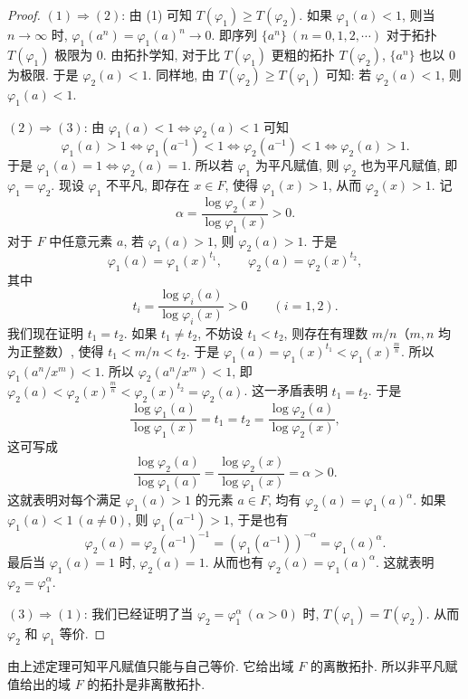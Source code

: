 \begin{proof}
$(1)\Rightarrow(2)$: 由 (1) 可知 $T(\varphi_1)\geqslant T(\varphi_2)$. 如果 $\varphi_1(a)<1$, 则当 $n\to\infty$ 时, $\varphi_1(a^n)=\varphi_1(a)^n\to 0$. 即序列 $\{a^n\}\ (n=0,1,2,\cdots)$ 对于拓扑 $T(\varphi_1)$ 极限为 $0$. 由拓扑学知, 对于比 $T(\varphi_1)$ 更粗的拓扑 $T(\varphi_2)$, $\{a^n\}$ 也以 $0$ 为极限. 于是 $\varphi_2(a)<1$. 同样地, 由 $T(\varphi_2)\geqslant T(\varphi_1)$ 可知: 若 $\varphi_2(a)<1$, 则 $\varphi_1(a)<1$.

$(2)\Rightarrow(3)$: 由 $\varphi_1(a)<1\Leftrightarrow\varphi_2(a)<1$ 可知
\[
  \varphi_1(a)>1\Leftrightarrow\varphi_1(a^{-1})<1\Leftrightarrow\varphi_2(a^{-1})<1\Leftrightarrow\varphi_2(a)>1.
\]
于是 $\varphi_1(a)=1\Leftrightarrow\varphi_2(a)=1$. 所以若 $\varphi_1$ 为平凡赋值, 则 $\varphi_2$ 也为平凡赋值, 即 $\varphi_1=\varphi_2$. 现设 $\varphi_1$ 不平凡, 即存在 $x\in F$, 使得 $\varphi_1(x)>1$, 从而 $\varphi_2(x)>1$. 记
\[
  \alpha=\frac{\log\varphi_2(x)}{\log\varphi_1(x)}>0.
\]
对于 $F$ 中任意元素 $a$, 若 $\varphi_1(a)>1$, 则 $\varphi_2(a)>1$. 于是
\[
  \varphi_1(a)=\varphi_1(x)^{t_1},\qquad\varphi_2(a)=\varphi_2(x)^{t_2},
\]
其中
\[
  t_i=\frac{\log\varphi_i(a)}{\log\varphi_i(x)}>0\qquad(i=1,2).
\]
我们现在证明 $t_1=t_2$. 如果 $t_1\neq t_2$, 不妨设 $t_1<t_2$, 则存在有理数 $m/n$（$m,n$ 均为正整数）, 使得 $t_1<m/n<t_2$. 于是 $\varphi_1(a)=\varphi_1(x)^{t_1}<\varphi_1(x)^{\frac{m}{n}}$. 所以 $\varphi_1(a^n/x^m)<1$. 所以 $\varphi_2(a^n/x^m)<1$, 即 $\varphi_2(a)<\varphi_2(x)^{\frac{m}{n}}<\varphi_2(x)^{t_2}=\varphi_2(a)$. 这一矛盾表明 $t_1=t_2$. 于是
\[
  \frac{\log\varphi_1(a)}{\log\varphi_1(x)}=t_1=t_2=\frac{\log\varphi_2(a)}{\log\varphi_2(x)},
\]
这可写成
\[
  \frac{\log\varphi_2(a)}{\log\varphi_1(a)}=\frac{\log\varphi_2(x)}{\log\varphi_1(x)}=\alpha>0.
\]
这就表明对每个满足 $\varphi_1(a)>1$ 的元素 $a\in F$, 均有 $\varphi_2(a)=\varphi_1(a)^{\alpha}$. 如果 $\varphi_1(a)<1\ (a\neq 0)$, 则 $\varphi_1(a^{-1})>1$, 于是也有
\[
  \varphi_2(a)=\varphi_2(a^{-1})^{-1}=(\varphi_1(a^{-1}))^{-\alpha}=\varphi_1(a)^{\alpha}.
\]
最后当 $\varphi_1(a)=1$ 时, $\varphi_2(a)=1$. 从而也有 $\varphi_2(a)=\varphi_1(a)^{\alpha}$. 这就表明 $\varphi_2=\varphi_1^{\alpha}$.

$(3)\Rightarrow(1)$: 我们已经证明了当 $\varphi_2=\varphi_1^{\alpha}\ (\alpha>0)$ 时, $T(\varphi_1)=T(\varphi_2)$. 从而 $\varphi_2$ 和 $\varphi_1$ 等价.
\end{proof}

\begin{remark}
由上述定理可知平凡赋值只能与自己等价. 它给出域 $F$ 的离散拓扑. 所以非平凡赋值给出的域 $F$ 的拓扑是非离散拓扑.
\end{remark}

